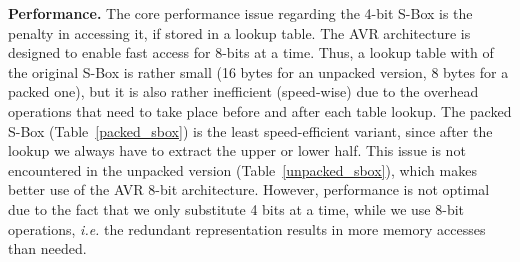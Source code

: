 \documentclass[11pt]{article}
\begin{document}
\textbf{Performance.} The core performance issue regarding the 4-bit S-Box is the penalty in accessing it, if stored in a lookup table. The AVR architecture is designed to enable fast access for 8-bits at a time. Thus, a lookup table with of the original S-Box is rather small (16 bytes for an unpacked version, 8 bytes for a packed one), but it is also rather inefficient (speed-wise) due to the overhead operations that need to take place before and after each table lookup. The packed S-Box (Table~\ref{packed_sbox}) is the least speed-efficient variant, since after the lookup we always have to extract the upper or lower half. This issue is not encountered in the unpacked version (Table~\ref{unpacked_sbox}), which makes better use of the AVR 8-bit architecture. However, performance is not optimal  due to the fact that we only substitute 4 bits at a time, while we use 8-bit operations, \emph{i.e.} the redundant representation results in more memory accesses than needed. 
\end{document}
